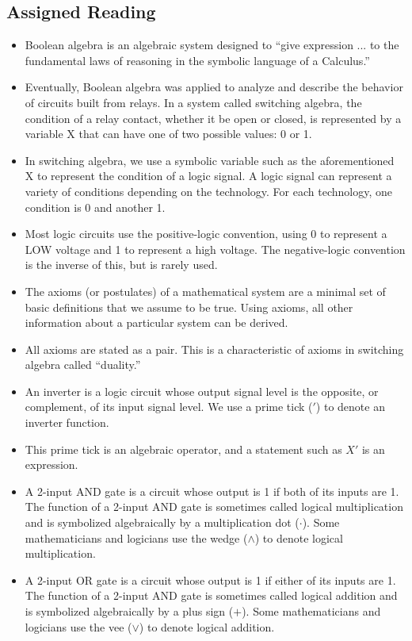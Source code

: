 \documentclass[10pt,a4paper]{article}
\begin{document}
\subsection{Assigned Reading}
\begin{itemize}
\item Boolean algebra is an algebraic system designed to ``give expression ... to the fundamental laws of reasoning in the symbolic language of a Calculus.''
\item Eventually, Boolean algebra was applied to analyze and describe the behavior of circuits built from relays. In a system called switching algebra, the condition of a relay contact, whether it be open or closed, is represented by a variable X that can have one of two possible values: 0 or 1. 
\item In switching algebra, we use a symbolic variable such as the aforementioned X to represent the condition of a logic signal. A logic signal can represent a variety of conditions depending on the technology. For each technology, one condition is 0 and another 1. 
\item Most logic circuits use the positive-logic convention, using 0 to represent a LOW voltage and 1 to represent a high voltage. The negative-logic convention is the inverse of this, but is rarely used.
\item The axioms (or postulates) of a mathematical system are a minimal set of basic definitions that we assume to be true. Using axioms, all other information about a particular system can be derived.
\item All axioms are stated as a pair. This is a characteristic of axioms in switching algebra called ``duality.''
\item An inverter is a logic circuit whose output signal level is the opposite, or complement, of its input signal level. We use a prime tick ($'$) to denote an inverter function. 
\item This prime tick is an algebraic operator, and a statement such as $X'$ is an expression. 
\item A 2-input AND gate is a circuit whose output is 1 if both of its inputs are 1. The function of a 2-input AND gate is sometimes called logical multiplication and is symbolized algebraically by a multiplication dot ($\cdot$). Some mathematicians and logicians use the wedge ($\wedge$) to denote logical multiplication. 
\item A 2-input OR gate is a circuit whose output is 1 if either of its inputs are 1. The function of a 2-input AND gate is sometimes called logical addition and is symbolized algebraically by a plus sign ($+$). Some mathematicians and logicians use the vee ($\vee$) to denote logical addition. 

\end{itemize}
\end{document}
